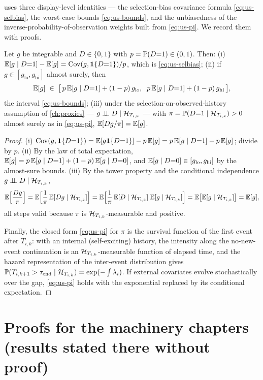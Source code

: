 uses three display-level identities --- the selection-bias covariance formula
\cref{eq:us-selbias}, the worst-case bounds \cref{eq:us-bounds}, and the unbiasedness of the
inverse-probability-of-observation weights built from \cref{eq:us-pi}. We record them with proofs.
\begin{proposition}
\label{app:pf:selection}
Let $g$ be integrable and $D \in \{0,1\}$ with $p = \mathbb{P}(D{=}1) \in (0,1)$. Then:
(i) $\mathbb{E}[g \mid D{=}1] - \mathbb{E}[g] = \operatorname{Cov}(g, \mathbf{1}\{D{=}1\})/p$, which is \cref{eq:us-selbias};
(ii) if $g \in [g_{\mathrm{lo}}, g_{\mathrm{hi}}]$ almost surely, then
\[
\mathbb{E}[g] \;\in\; \big[\, p\,\mathbb{E}[g \mid D{=}1] + (1-p)\, g_{\mathrm{lo}},\;\;
p\,\mathbb{E}[g \mid D{=}1] + (1-p)\, g_{\mathrm{hi}} \,\big],
\]
the interval \cref{eq:us-bounds};
(iii) under the selection-on-observed-history assumption of \cref{ch:proxies} --- $g \perp\!\!\!\perp D \mid
\mathcal{H}_{T_{i,k}}$ --- with $\pi = \mathbb{P}(D{=}1 \mid \mathcal{H}_{T_{i,k}}) > 0$ almost surely as in
\cref{eq:us-pi}, $\mathbb{E}[D g/\pi] = \mathbb{E}[g]$.
\end{proposition}
\begin{proof}
(i) $\operatorname{Cov}(g, \mathbf{1}\{D{=}1\}) = \mathbb{E}[g \mathbf{1}\{D{=}1\}] - p\,\mathbb{E}[g] = p\,\mathbb{E}[g \mid D{=}1] - p\,\mathbb{E}[g]$; divide by
$p$. (ii) By the law of total expectation, $\mathbb{E}[g] = p\,\mathbb{E}[g \mid D{=}1] + (1-p)\,\mathbb{E}[g \mid D{=}0]$, and
$\mathbb{E}[g \mid D{=}0] \in [g_{\mathrm{lo}}, g_{\mathrm{hi}}]$ by the almost-sure bounds. (iii) By the tower
property and the conditional independence $g \perp\!\!\!\perp D \mid \mathcal{H}_{T_{i,k}}$,
\[
\mathbb{E}\Big[\frac{D g}{\pi}\Big]
= \mathbb{E}\Big[\frac{1}{\pi}\, \mathbb{E}[D g \mid \mathcal{H}_{T_{i,k}}]\Big]
= \mathbb{E}\Big[\frac{1}{\pi}\, \mathbb{E}[D \mid \mathcal{H}_{T_{i,k}}]\; \mathbb{E}[g \mid \mathcal{H}_{T_{i,k}}]\Big]
= \mathbb{E}\big[\mathbb{E}[g \mid \mathcal{H}_{T_{i,k}}]\big] = \mathbb{E}[g],
\]
all steps valid because $\pi$ is $\mathcal{H}_{T_{i,k}}$-measurable and positive.

Finally, the closed form \cref{eq:us-pi} for $\pi$ is the survival function of the first event after
$T_{i,k}$: with an internal (self-exciting) history, the intensity along the no-new-event continuation
is an $\mathcal{H}_{T_{i,k}}$-measurable function of elapsed time, and the hazard representation of the
inter-event distribution \citep[Ch.~7.2]{daley2003} gives $\mathbb{P}(T_{i,k+1} > \tau_{\mathrm{end}} \mid
\mathcal{H}_{T_{i,k}}) = \exp(-\int \lambda_i)$. If external covariates evolve stochastically over the gap,
\cref{eq:us-pi} holds with the exponential replaced by its conditional expectation.
\end{proof}

\section{Proofs for the machinery chapters (results stated there without proof)}
\label{app:pf:machinery}

